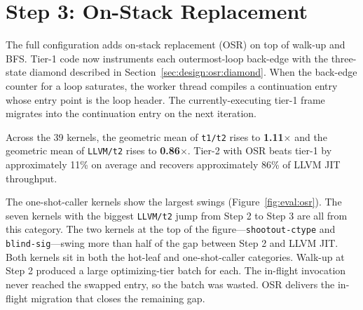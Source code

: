 \section{Step 3: On-Stack Replacement}
\label{sec:eval:step3}

The full configuration adds on-stack replacement (OSR) on top of walk-up and BFS. Tier-1 code now instruments each outermost-loop back-edge with the three-state diamond described in Section~\ref{sec:design:osr:diamond}. When the back-edge counter for a loop saturates, the worker thread compiles a continuation entry whose entry point is the loop header. The currently-executing tier-1 frame migrates into the continuation entry on the next iteration.

Across the 39 kernels, the geometric mean of \texttt{t1/t2} rises to \textbf{1.11$\times$} and the geometric mean of \texttt{LLVM/t2} rises to \textbf{0.86$\times$}. Tier-2 with OSR beats tier-1 by approximately 11\% on average and recovers approximately 86\% of LLVM JIT throughput.

The one-shot-caller kernels show the largest swings (Figure~\ref{fig:eval:osr}). The seven kernels with the biggest \texttt{LLVM/t2} jump from Step 2 to Step 3 are all from this category. The two kernels at the top of the figure---\texttt{shootout-ctype} and \texttt{blind-sig}---swing more than half of the gap between Step 2 and LLVM JIT. Both kernels sit in both the hot-leaf and one-shot-caller categories. Walk-up at Step 2 produced a large optimizing-tier batch for each. The in-flight invocation never reached the swapped entry, so the batch was wasted. OSR delivers the in-flight migration that closes the remaining gap.

